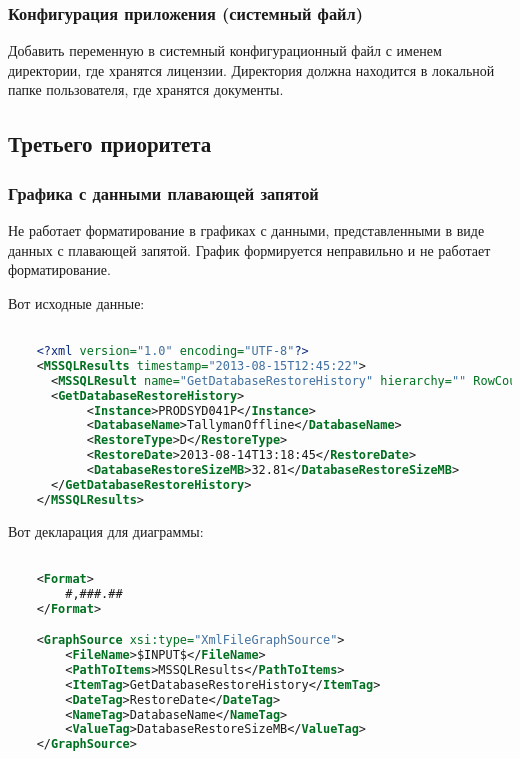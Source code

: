 \subsubsection{Конфигурация приложения (системный файл)}

Добавить переменную в системный конфигурационный файл с именем директории, где хранятся лицензии.
Директория должна находится в локальной папке пользователя, где хранятся документы.

\subsection{Третьего приоритета}

\subsubsection{Графика с данными плавающей запятой}

Не работает форматирование в графиках с данными, представленными в виде данных с плавающей запятой.
График формируется неправильно и не работает форматирование.

Вот исходные данные:

\begin{lstlisting}[language=XML,label=GanttChartData,caption=Данные для диаграммы]

	<?xml version="1.0" encoding="UTF-8"?>
	<MSSQLResults timestamp="2013-08-15T12:45:22">
	  <MSSQLResult name="GetDatabaseRestoreHistory" hierarchy="" RowCount="1" SqlErrorCode="" SqlErrorNumber="" />
	  <GetDatabaseRestoreHistory>
		   <Instance>PRODSYD041P</Instance>
		   <DatabaseName>TallymanOffline</DatabaseName>
		   <RestoreType>D</RestoreType>
		   <RestoreDate>2013-08-14T13:18:45</RestoreDate>
		   <DatabaseRestoreSizeMB>32.81</DatabaseRestoreSizeMB>
	  </GetDatabaseRestoreHistory>
	</MSSQLResults>

\end{lstlisting}

Вот декларация для диаграммы:

\begin{lstlisting}[language=XML,label=GanttChartDefinition,caption=Определение для диаграммы]

	<Format>
		#,###.##
	</Format>

	<GraphSource xsi:type="XmlFileGraphSource">
		<FileName>$INPUT$</FileName>
		<PathToItems>MSSQLResults</PathToItems>
		<ItemTag>GetDatabaseRestoreHistory</ItemTag>
		<DateTag>RestoreDate</DateTag>
		<NameTag>DatabaseName</NameTag>
		<ValueTag>DatabaseRestoreSizeMB</ValueTag>
	</GraphSource>

\end{lstlisting}

